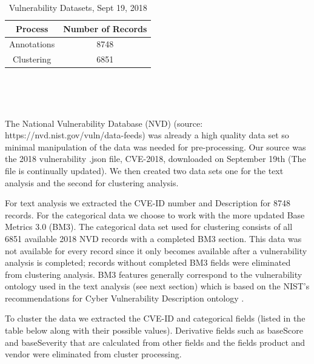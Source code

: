 \documentclass{article} %
\begin{document}
\begin{table}[h!]
\begin{center} 
\begin{tabular}{ |c|c|  } \hline
 Process & Number of Records \\ \hline
 Annotations & 8748  \\  \hline
 Clustering & 6851  \\   \hline
\end{tabular} \\
\label{table:1}
\end{center}
\label{table:1}
\caption{Vulnerability Datasets, Sept 19, 2018} \\
\end{table}

The National Vulnerability Database (NVD) (source:  https://nvd.nist.gov/vuln/data-feeds) was already a high quality data set so minimal manipulation of the data was needed for pre-processing. Our source was the 2018 vulnerability .json file, CVE-2018, downloaded on September 19th (The file is continually updated). We then created two data sets one for the text analysis and the second for clustering analysis.  

For text analysis we extracted the CVE-ID number and Description for 8748 records.  For the categorical data we choose to work with the more updated Base Metrics 3.0 (BM3). The categorical data set used for clustering consists of all 6851 available 2018 NVD records with a completed BM3 section.  This data was not available for every record since it only becomes available after a vulnerability analysis is completed; records without completed BM3 fields were eliminated from clustering analysis.  BM3 features generally correspond to the vulnerability ontology used in the text analysis (see next section) which is based on the NIST's recommendations for Cyber Vulnerability Description ontology \cite{Booth2016DraftOntology}.

To cluster the data we extracted the CVE-ID and categorical fields (listed in the table below along with their possible values).  Derivative fields such as baseScore and baseSeverity that are calculated from other fields and the fields product and vendor were eliminated from cluster processing.    
\end{document}
